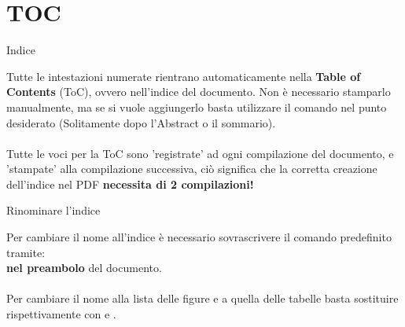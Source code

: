 \section{TOC}
\begin{frame}{Indice}

    Tutte le intestazioni numerate rientrano automaticamente nella \textbf{Table of Contents} (ToC), ovvero nell'indice del documento. Non è necessario stamparlo manualmente, ma se si vuole aggiungerlo basta utilizzare il comando \texttt{\tableofcontents} nel punto desiderato (Solitamente dopo l'Abstract o il sommario).\\\\
    Tutte le voci per la ToC sono 'registrate' ad ogni compilazione del documento, e 'stampate' alla compilazione successiva, ciò significa che la corretta creazione dell'indice nel PDF \textbf{necessita di 2 compilazioni!}

\end{frame}


\begin{frame}{Rinominare l'indice}

    Per cambiare il nome all'indice è necessario sovrascrivere il comando predefinito tramite:\\
    \texttt{\renewcommand{\contentsname}{<nuovo nome>}} \textbf{nel preambolo} del documento.\\\\
    Per cambiare il nome alla lista delle figure e a quella delle tabelle basta sostituire  \texttt{\contentsname} rispettivamente con \texttt{\listfigurename} e  \texttt{\listtablename}.
    
\end{frame}

